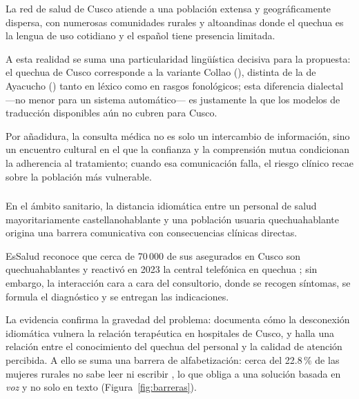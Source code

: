 \begin{bloqueObsDos}
\noindent La red de salud de Cusco atiende a una poblaci{\'o}n extensa y geogr{\'a}ficamente
dispersa, con numerosas comunidades rurales y altoandinas donde el quechua es la lengua de uso
cotidiano y el espa{\~n}ol tiene presencia limitada.

\noindent A esta realidad se suma una particularidad
ling{\"u}{\'i}stica decisiva para la propuesta: el quechua de Cusco corresponde a la variante Collao
(), distinta de la de Ayacucho () tanto en l{\'e}xico como en rasgos
fonol{\'o}gicos; esta diferencia dialectal ---no menor para un sistema autom{\'a}tico--- es
justamente la que los modelos de traducci{\'o}n disponibles a{\'u}n no cubren para Cusco.

\noindent Por
a{\~n}adidura, la consulta m{\'e}dica no es solo un intercambio de informaci{\'o}n, sino un encuentro
cultural en el que la confianza y la comprensi{\'o}n mutua condicionan la adherencia al tratamiento;
cuando esa comunicaci{\'o}n falla, el riesgo cl{\'i}nico recae sobre la poblaci{\'o}n m{\'a}s
vulnerable.
\end{bloqueObsDos}

\subsubsection{}

En el {\'a}mbito sanitario, la distancia idiom{\'a}tica entre un personal de salud mayoritariamente
castellanohablante y una poblaci{\'o}n usuaria quechuahablante origina una barrera comunicativa con
consecuencias cl{\'i}nicas directas.

EsSalud reconoce que cerca de 70\,000 de sus asegurados en
Cusco son quechuahablantes y reactiv{\'o} en 2023 la central telef{\'o}nica en quechua
\parencite{essalud2023}; sin embargo,  la interacci{\'o}n cara a cara del
consultorio, donde se recogen s{\'i}ntomas, se formula el diagn{\'o}stico y se entregan las
indicaciones.

La evidencia confirma la gravedad del problema: \textcite{begazo2026} documenta
c{\'o}mo la desconexi{\'o}n idiom{\'a}tica vulnera la relaci{\'o}n terap{\'e}utica en hospitales de
Cusco, y \textcite{cuaila2022} halla una relaci{\'o}n entre el conocimiento del quechua del personal
y la calidad de atenci{\'o}n percibida. A ello se suma una barrera de alfabetizaci{\'o}n: cerca del
22.8\,\% de las mujeres rurales no sabe leer ni escribir \parencite{inei2023}, lo que obliga a una
soluci{\'o}n basada en \emph{voz} y no solo en texto (Figura~\ref{fig:barreras}).


